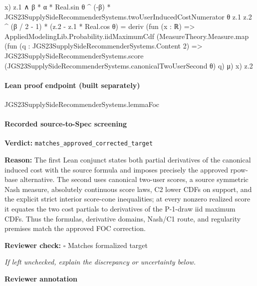\documentclass[10pt]{article}
\newcommand{\reviewerbox}{%
  \par\noindent\fbox{\parbox{0.96\linewidth}{\rule{0pt}{0.38in}}}\par
}
\newcommand{\reviewmatch}[1]{%
  \par\noindent\textbf{Reviewer check:} $\square$\; #1\par
  \noindent\emph{If left unchecked, explain the discrepancy or uncertainty below.}\par
}
\begin{document}
\begin{ReviewVerbatim}
                              x)
                          z.1 ∧
                      β * α * Real.sin θ ^ (-β) *
                            JGS23SupplySideRecommenderSystems.twoUserInducedCostNumerator θ z.1 z.2 ^ (β / 2 - 1) *
                          (z.2 - z.1 * Real.cos θ) =
                        deriv
                          (fun (x : ℝ) =>
                            AppliedModelingLib.Probability.iidMaximumCdf
                              (MeasureTheory.Measure.map
                                (fun (q : JGS23SupplySideRecommenderSystems.Content 2) =>
                                  JGS23SupplySideRecommenderSystems.score
                                    (JGS23SupplySideRecommenderSystems.canonicalTwoUserSecond θ) q)
                                μ)
                              x)
                          z.2
\end{ReviewVerbatim}

\paragraph{Lean proof endpoint (built separately)}\begin{ReviewVerbatim}
JGS23SupplySideRecommenderSystems.lemmaFoc
\end{ReviewVerbatim}

\paragraph{Recorded source-to-Spec screening}
\textbf{Verdict:} \texttt{matches\_approved\_corrected\_target}
\\
{\raggedright
\textbf{Reason:} The first Lean conjunct states both partial derivatives of the canonical induced cost with the source formula and imposes precisely the approved rpow-\allowbreak{}base alternative.\allowbreak{} The second uses canonical two-\allowbreak{}user scores, a source symmetric Nash measure, absolutely continuous score laws, C2 lower CDFs on support, and the explicit strict interior score-\allowbreak{}cone inequalities;\allowbreak{} at every nonzero realized score it equates the two cost partials to derivatives of the P-\allowbreak{}1-\allowbreak{}draw iid maximum CDFs.\allowbreak{} Thus the formulas, derivative domains, Nash/\allowbreak{}C1 route, and regularity premises match the approved FOC correction.\allowbreak{}
\par}
\reviewmatch{Matches formalized target}
\noindent\textbf{Reviewer annotation}\par
\reviewerbox
\clearpage
\hypertarget{source-claim-cb0dec98047069af}{}
\end{document}
